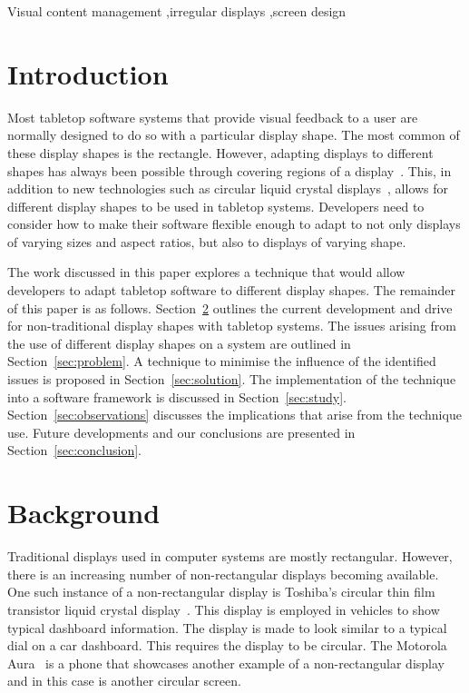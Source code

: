 \documentclass[review,5p,times,twocolumn]{elsarticle}
\begin{document}
\begin{frontmatter}
\begin{keyword}
Visual content management \sep irregular displays \sep screen design
\end{keyword}


\end{frontmatter}

\section{Introduction}
\label{sec:intro}

Most tabletop software systems that provide visual feedback to a user are normally designed to do so with a particular display shape.
The most common of these display shapes is the rectangle.
However, adapting displays to different shapes has always been possible through covering regions of a display~\cite{Dietz2004}.
This, in addition to new technologies such as circular liquid crystal displays~\cite{Boyd2007,Finney2009}, allows for different display shapes to be used in tabletop systems. 
Developers need to consider how to make their software flexible enough to adapt to not only displays of varying sizes and aspect ratios, but also to displays of varying shape.

The work discussed in this paper explores a technique that would allow developers to adapt tabletop software to different display shapes.
The remainder of this paper is as follows. 
Section~\ref{sec:related} outlines the current development and drive for non-traditional display shapes with tabletop systems. 
The issues arising from the use of different display shapes on a system are outlined in Section~\ref{sec:problem}.
A technique to minimise the influence of the identified issues is proposed in Section~\ref{sec:solution}.
The implementation of the technique into a software framework is discussed in Section~\ref{sec:study}.
Section~\ref{sec:observations} discusses the implications that arise from the technique use.
Future developments and our conclusions are presented in Section~\ref{sec:conclusion}.

\section{Background}
\label{sec:related}

Traditional displays used in computer systems are mostly rectangular.
However, there is an increasing number of non-rectangular displays becoming available.
One such instance of a non-rectangular display is Toshiba's circular thin film transistor liquid crystal display~\cite{Boyd2007}.
This display is employed in vehicles to show typical dashboard information.
The display is made to look similar to a typical dial on a car dashboard.
This requires the display to be circular.
The Motorola Aura~\cite{Finney2009} is a phone that showcases another example of a non-rectangular display and in this case is another circular screen.
\end{document}
